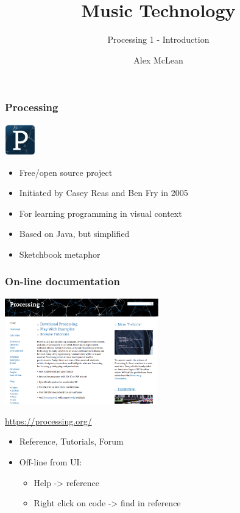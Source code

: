 \documentclass[ignorenonframetext,]{beamer}
\title{Music Technology}
\author{Processing 1 - Introduction}
\date{Alex McLean}
\begin{document}
\frame{\titlepage}

\begin{frame}\frametitle{Processing}

\includegraphics[width=0.1\textwidth]{../images/processing2-logo.jpg}

\begin{itemize}
\item
  Free/open source project
\item
  Initiated by Casey Reas and Ben Fry in 2005
\item
  For learning programming in visual context
\item
  Based on Java, but simplified
\item
  Sketchbook metaphor
\end{itemize}

\end{frame}

\begin{frame}\frametitle{On-line documentation}

\begin{center}
\includegraphics[width=0.5\textwidth]{../images/processingorg.png}

\url{https://processing.org/}
\end{center}

\begin{itemize}
\item
  Reference, Tutorials, Forum
\item
  Off-line from UI:

  \begin{itemize}
  \item
    Help -\textgreater{} reference
  \item
    Right click on code -\textgreater{} find in reference
  \end{itemize}
\end{itemize}

\end{frame}
\end{document}
